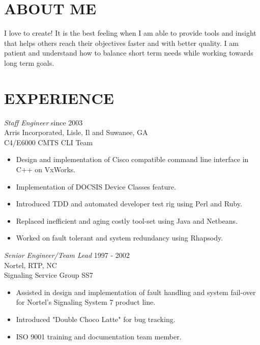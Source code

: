 \documentclass[line,margin]{res}
\begin{document}
\address{2910 Saddlebrook Glen Dr.}
\address{Cumming, GA 30041}

\begin{resume}
\section{ABOUT ME} I love to create!  It is the best feeling when I am able to provide tools and insight that helps others 
                reach their objectives faster and with better quality. I am patient and understand how to balance short
                term needs while working towards long term goals.

\section{EXPERIENCE} {\sl Staff Engineer} \hfill since 2003 \\
                Arris Incorporated, Lisle, Il and Suwanee, GA \\
                C4/E6000 CMTS CLI Team
                 \begin{itemize}  \itemsep -2pt %
                 \item Design and implementation of Cisco compatible command line interface in C++ on VxWorks.
                 \item Implementation of DOCSIS Device Classes feature.
                 \item Introduced TDD and automated developer test rig using Perl and Ruby.
                 \item Replaced inefficient and aging costly tool-set using Java and Netbeans.
                 \item Worked on fault tolerant and system redundancy using Rhapsody.
                 \end{itemize}

                {\sl Senior Engineer/Team Lead} \hfill 1997 - 2002 \\
                Nortel, RTP, NC \\
                Signaling Service Group SS7
                 \begin{itemize}  \itemsep -2pt %
                 \item Assisted in design and implementation of fault handling and system fail-over for Nortel's Signaling System 7 product line.
                 \item Introduced "Double Choco Latte" for bug tracking. 
                 \item ISO 9001 training and documentation team member.
                 \end{itemize}
                

\end{resume}
\end{document}
